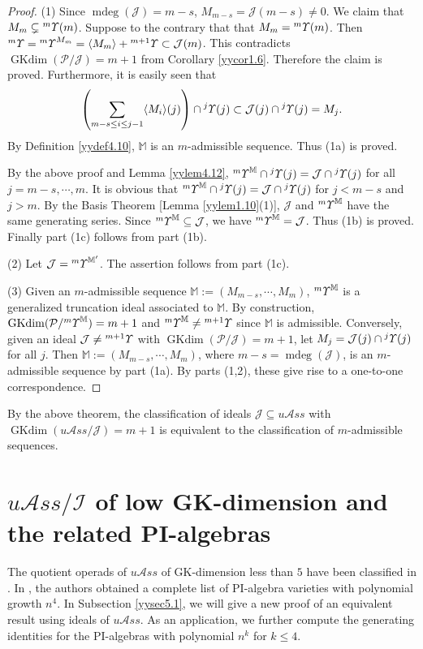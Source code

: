 \documentclass{amsart}
\theoremstyle{definition}
\theoremstyle{remark}
\numberwithin{equation}{section}
\def\mdeg{\operatorname{mdeg}}
\newcommand{\lr}[1]{\langle #1 \rangle}
\newcommand{\up}[1]{{^{#1}{\it \!\Upsilon}}}
\def \uas{u\mathcal{A}ss}
\def \I{\mathcal{I}}
\def \J{\mathcal{J}}
\def \ip{{\mathcal{P}}}
\def\gkdim{\operatorname{GKdim}}
\begin{document}
\begin{proof}
(1) Since $\mdeg(\J)=m-s$, $M_{m-s}=\J(m-s)\neq 0$. 
We claim that $M_m\subsetneq \up{m}(m)$. Suppose 
to the contrary that that $M_m=\up{m}(m)$. Then 
$\up{m}=\up{m}^{M_m} =\lr{M_m}+\up{m+1}\subset \J(m)$. 
This contradicts $\gkdim(\ip/\J)=m+1$ from 
Corollary \ref{yycor1.6}. Therefore the claim is proved.
Furthermore, it is easily seen that 
\[\left(\sum_{m-s\le i\le j-1}\lr{M_i}(j)\right)\cap \up{j}(j)
\subset \J(j)\cap \up{j}(j)=M_j.\]
By Definition \ref{yydef4.10}, ${\mathbb M}$ is an 
$m$-admissible sequence. Thus (1a) is proved. 

By the above proof and Lemma \ref{yylem4.12}, 
$\up{m}^\mathbb{M}\cap \up{j}(j)=\J\cap \up{j}(j)$
for all $j=m-s,\cdots,m$. It is obvious that 
$\up{m}^\mathbb{M}\cap \up{j}(j)=\J\cap \up{j}(j)$ for 
$j<m-s$ and $j>m$. By the Basis Theorem 
[Lemma \ref{yylem1.10}(1)], 
$\J$ and $\up{m}^\mathbb{M}$ have the same generating 
series. Since $\up{m}^\mathbb{M}\subseteq \J$, we 
have $\up{m}^\mathbb{M}=\J$. Thus (1b) is proved. 
Finally part (1c) follows from part (1b).	
 

(2) Let $\J=\up{m}^{{\mathbb M}'}$. The assertion 
follows from part (1c).

(3) Given an $m$-admissible sequence ${\mathbb M}:=
(M_{m-s},\cdots, M_m)$, $\up{m}^{\mathbb M}$ is a 
generalized truncation ideal associated to ${\mathbb M}$.
By construction, $\gkdim (\ip/\up{m}^{\mathbb M})=m+1$ and
$\up{m}^{\mathbb M}\neq \up{m+1}$ since ${\mathbb M}$ 
is admissible. Conversely, given an ideal $\J\neq \up{m+1}$ 
with $\gkdim (\ip/\J)=m+1$, let $M_{j}=\J(j)\cap \up{j}(j)$ 
for all $j$. Then ${\mathbb M}:=(M_{m-s},\cdots, M_m)$, 
where $m-s=\mdeg(\J)$, is an $m$-admissible sequence by 
part (1a). By parts (1,2), these give rise to a 
one-to-one correspondence. 
\end{proof}

By the above theorem, the classification of ideals $\J\subseteq \uas$ 
with $\gkdim (\uas/\J)=m+1$ is equivalent to the classification of 
$m$-admissible sequences. 

\section{$\uas/\I$ of low GK-dimension and the related PI-algebras}
\label{yysec5}

The quotient operads of $\uas$ of GK-dimension less than $5$ 
have been classified in \cite[Theorem 0.6]{BYZ}. In \cite{OV}, 
the authors obtained a complete list of PI-algebra varieties 
with polynomial growth $n^4$. In Subsection \ref{yysec5.1}, 
we will give a new proof of an equivalent result using 
ideals of $\uas$. As an application, we further 
compute the generating identities for the PI-algebras with 
polynomial $n^k$ for $k\le 4$.
\end{document}
